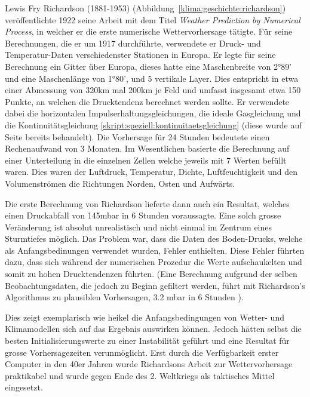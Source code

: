 \begin{refsection}
Lewis Fry Richardson (1881-1953) (Abbildung~\ref{klima:geschichte:richardson}) veröffentlichte 1922 seine Arbeit mit dem Titel {\em Weather Prediction by Numerical Process}, in welcher er die erste numerische Wettervorhersage tätigte. Für seine Berechnungen, die er um 1917 durchführte, verwendete er Druck- und Temperatur-Daten verschiedenster Stationen in Europa. Er legte für seine Berechnung ein Gitter über Europa, dieses hatte eine Maschenbreite von 2°89' und eine Maschenlänge von 1°80', und 5 vertikale Layer. Dies entspricht in etwa einer Abmessung von 320km mal 200km je Feld und umfasst insgesamt etwa 150 Punkte, an welchen die Drucktendenz berechnet werden sollte. Er verwendete dabei die horizontalen Impulserhaltungsgleichungen, die ideale Gasgleichung und die Kontinuitätsgleichung \eqref{skript:speziell:kontinuitaetsgleichung} (diese wurde auf Seite \pageref{skript:speziell:kontinuitaetsgleichung} bereits behandelt). Die Vorhersage für 24 Stunden bedeutete einen Rechenaufwand von 3 Monaten. Im Wesentlichen basierte die Berechnung auf einer Unterteilung in die einzelnen Zellen welche jeweils mit 7 Werten befüllt waren. Dies waren der Luftdruck, Temperatur, Dichte, Luftfeuchtigkeit und den Volumenströmen die Richtungen Norden, Osten und Aufwärts.

Die erste Berechnung von Richardson lieferte dann auch ein Resultat, welches einen Druckabfall von 145mbar in 6 Stunden voraussagte. Eine solch grosse Veränderung ist absolut unrealistisch und nicht einmal im Zentrum eines Sturmtiefes möglich. Das Problem war, dass die Daten des Boden-Drucks, welche als Anfangsbedinungen verwendet wurden, Fehler enthielten. Diese Fehler führten dazu, dass sich während der numerischen Prozedur die Werte aufschaukelten und somit zu hohen Drucktendenzen führten. (Eine Berechnung aufgrund der selben Beobachtungsdaten, die jedoch zu Beginn gefiltert werden, führt mit Richardson's Algorithmus zu plausiblen Vorhersagen, 3.2 mbar in 6 Stunden \cite{klima:stocker}).

Dies zeigt exemplarisch wie heikel die Anfangsbedingungen von Wetter- und Klimamodellen sich auf das Ergebnis auswirken können. Jedoch hätten selbst die besten Initialisierungswerte zu einer Instabilität geführt und eine Resultat für grosse Vorhersagezeiten verunmöglicht. Erst durch die Verfügbarkeit erster Computer in den 40er Jahren wurde Richardsons Arbeit zur  Wettervorhersage praktikabel und wurde gegen Ende des 2. Weltkriegs als taktisches Mittel eingesetzt.


\end{refsection}
